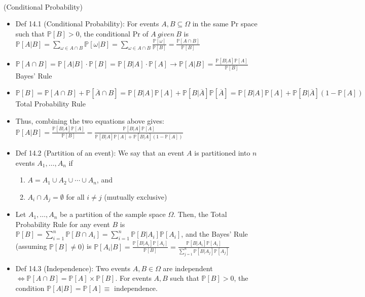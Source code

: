 \documentclass{article}
\begin{document}
 \\
(Conditional Probability)
\begin{itemize}
	\item Def 14.1 (Conditional Probability): For events $A,B \subseteq\Omega$ in the same Pr space such that $\mathbb{P}[B]>0$, the conditional Pr of $A\ given\ B$ is $\mathbb{P}[A|B] = \sum\limits_{\omega\in A\cap B} \mathbb{P}[\omega|B] = \sum\limits_{\omega\in A\cap B} \frac{\mathbb{P}[\omega]}{\mathbb{P}[B]} = \frac{\mathbb{P}[A\cap B]}{\mathbb{P}[B]}$
	\item $\mathbb{P}[A\cap B] = \mathbb{P}[A|B]\cdot\mathbb{P}[B] = \mathbb{P}[B|A]\cdot\mathbb{P}[A]\longrightarrow\mathbb{P}[A|B] = \frac{\mathbb{P}[B|A]\mathbb{P}[A]}{\mathbb{P}[B]}$ Bayes' Rule
	\item $\mathbb{P}[B] = \mathbb{P}[A\cap B] + \mathbb{P}[\overline{A}\cap B] = \mathbb{P}[B|A]\mathbb{P}[A] + \mathbb{P}[B|\overline{A}]\mathbb{P}[\overline{A}] = \mathbb{P}[B|A]\mathbb{P}[A] + \mathbb{P}[B|\overline{A}](1-\mathbb{P}[A])$ Total Probability Rule
	\item Thus, combining the two equations above gives: {\color{red} $\mathbb{P}[A|B] = \frac{\mathbb{P}[B|A]\mathbb{P}[A]}{\mathbb{P}[B]} = \frac{\mathbb{P}[B|A]\mathbb{P}[A]}{\mathbb{P}[B|A]\mathbb{P}[A] + \mathbb{P}[B|\overline{A}](1-\mathbb{P}[A])}$}
	\item Def 14.2 (Partition of an event): We say that an event $A$ is partitioned into $n$ events $A_1,\dots,A_n$ if
	\begin{enumerate}
		\item $A = A_1\cup A_2\cup \cdots \cup A_n$, and
		\item $A_i\cap A_j = \emptyset$ for all $i\neq j$ (mutually exclusive)
	\end{enumerate}
	\item Let $A_1,\dots,A_n$ be a partition of the sample space $\Omega$. Then, the Total Probability Rule for any event $B$ is $\mathbb{P}[B] = \sum\limits_{i=1}^n \mathbb{P}[B\cap A_i] = \sum\limits_{i=1}^n \mathbb{P}[B|A_i]\mathbb{P}[A_i]$, and the Bayes' Rule (assuming $\mathbb{P}[B]\neq0$) is $\mathbb{P}[A_i|B] = \frac{\mathbb{P}[B|A_i]\mathbb{P}[A_i]}{\mathbb{P}[B]} = \frac{\mathbb{P}[B|A_i]\mathbb{P}[A_i]}{\sum\limits_{j=1}^n \mathbb{P}[B|A_j]\mathbb{P}[A_j]}$
	\item Def 14.3 (Independence): Two events $A,B\in\Omega$ are independent $\iff\mathbb{P}[A\cap B] = \mathbb{P}[A]\times \mathbb{P}[B]$. For events $A,B$ such that $\mathbb{P}[B] > 0$, the condition $\mathbb{P}[A|B] = \mathbb{P}[A]\equiv$ independence.

\end{itemize}
\end{document}
